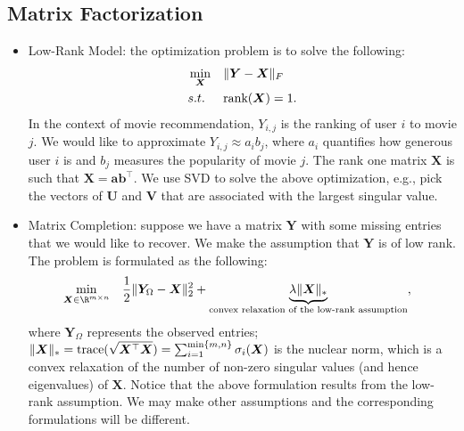 \subsection{Matrix Factorization}
    \begin{itemize}
        \item Low-Rank Model: the optimization problem is to solve the following:
            \begin{equation}
                \begin{aligned}
                            & \min_{\bm{X}}  & & \lVert\bm{Y} - \bm{X}\rVert_F \\
                            & s.t. & & \text{rank}(\bm{X}) = 1.
                \end{aligned}
            \end{equation}
        In the context of movie recommendation, $Y_{i,j}$ is the ranking of user $i$ to movie $j$.
        We would like to approximate $Y_{i,j} \approx a_i b_j$, where $a_i$ quantifies how generous user $i$ is and $b_j$ measures the  popularity of movie $j$.
        The rank one matrix $\bm{X}$ is such that $\bm{X}=\bm{a}\bm{b}^\top$.
        We use SVD to solve the above optimization, e.g., pick the vectors of $\bm{U}$ and $\bm{V}$ that are associated with the largest singular value.
        \item Matrix Completion: suppose we have a matrix $\bm{Y}$ with some missing entries that we would like to recover. 
        We make the assumption that $\bm{Y}$ is of low rank.
        The problem is formulated as the following:
            \begin{equation}
                \begin{aligned}
                            & \min_{\bm{X} \in \R^{m \times n}} & & \frac{1}{2}\norm{\bm{Y}_\Omega - \bm{X}}_2^2 + \underbrace{\lambda \norm{\bm{X}}_\ast}_{\text{convex relaxation of the low-rank assumption}},
                \end{aligned}
            \end{equation}
        where $\bm{Y}_\Omega$ represents the observed entries; $\lVert\bm{X}\rVert_\ast = \text{trace}(\sqrt{\bm{X}^\top \bm{X}}) = \sum_{i=1}^{\min \{ m, n \}}{\sigma_i(\bm{X})}$ is the nuclear norm, which is a convex relaxation of the number of non-zero singular values (and hence eigenvalues) of $\bm{X}$.
        Notice that the above formulation results from the low-rank assumption.
        We may make other assumptions and the corresponding formulations will be different. 
        

\end{itemize}
